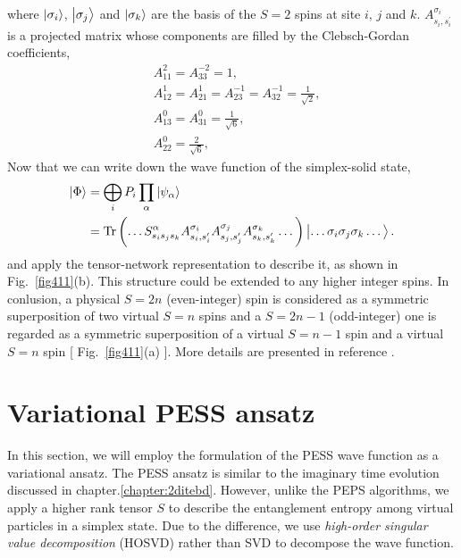 where $\Ket{\sigma_i}$, $\Ket{\sigma_j}$ and $\Ket{\sigma_k}$ are the basis of the $S=2$ spins at site $i$, $j$ and $k$. $A^{\sigma_i}_{s_i,s_i^{\prime}}$ is a projected matrix whose components are filled by the Clebsch-Gordan coefficients,
\[
	\begin{aligned}
		&A_{11}^2 = A_{33}^{-2} = 1, \\
		&A_{12}^1 = A_{21}^{1} = A_{23}^{-1} = A_{32}^{-1} = \frac{1}{\sqrt{2}}, \\
		&A_{13}^0 = A_{31}^{0} = \frac{1}{\sqrt{6}}, \\
		&A_{22}^0 = \frac{2}{\sqrt{6}},
	\end{aligned}
\]
Now that we can write down the wave function of the simplex-solid state,
\begin{align}
	\Ket{\Phi} &= \bigoplus_i P_i \prod_{\alpha}{\Ket{\psi_{\alpha}}} \\
	&= \operatorname{Tr} \left( \dots S_{s_i s_j s_k}^{\alpha} A^{\sigma_i}_{s_i,s_i^{\prime}} A^{\sigma_j}_{s_j,s_j^{\prime}} A^{\sigma_k}_{s_k,s_k^{\prime}} \dots \right) \Ket{\dots \sigma_i \sigma_j \sigma_k \dots}.
\end{align}
and apply the tensor-network representation to describe it, as shown in Fig.~\ref{fig411}(b).
This structure could be extended to any higher integer spins. In conlusion, a physical $S=2n$ (even-integer) spin is considered as a symmetric superposition of two virtual $S=n$ spins and a $S=2n-1$ (odd-integer) one is regarded as a symmetric superposition of a virtual $S=n-1$ spin and a virtual $S=n$ spin [ Fig.~\ref{fig411}(a) ]. More details are presented in reference \cite{PhysRevB.93.075154} \cite{0953-8984-21-45-456009}.

\section{Variational PESS ansatz}
In this section, we will employ the formulation of the PESS wave function as a variational ansatz. The PESS ansatz is similar to the imaginary time evolution discussed in chapter.\ref{chapter:2ditebd}. However, unlike the PEPS algorithms, we apply a higher rank tensor $S$ to describe the entanglement entropy among virtual particles in a simplex state. Due to the difference, we use \textit{high-order singular value decomposition} (HOSVD) \cite{PhysRevB.86.045139} \cite{doi:10.1137/S0895479896305696} rather than SVD to decompose the wave function.

